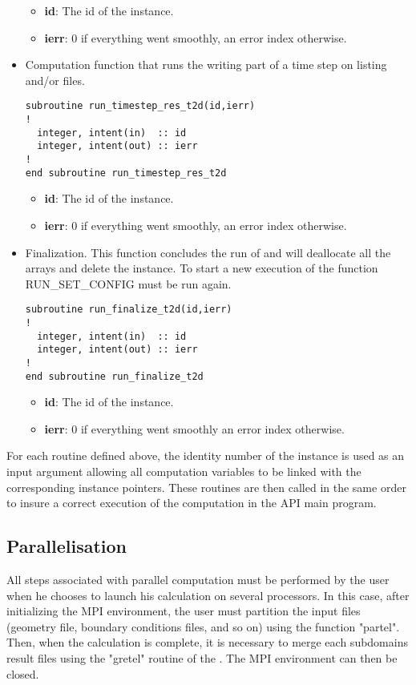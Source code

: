 \begin{itemize}
\begin{itemize}
\item \textbf{id}: The id of the instance.
\item \textbf{ierr}: 0 if everything went smoothly, an error index otherwise.
\end{itemize}

\item Computation function that runs the writing part of a time step on listing and/or files.

\begin{lstlisting}
subroutine run_timestep_res_t2d(id,ierr)
!
  integer, intent(in)  :: id
  integer, intent(out) :: ierr
!
end subroutine run_timestep_res_t2d
\end{lstlisting}


\begin{itemize}
\item \textbf{id}: The id of the instance.
\item \textbf{ierr}: 0 if everything went smoothly, an error index otherwise.
\end{itemize}

\item Finalization. This function concludes the run of  and will
  deallocate all the arrays and delete the instance. To start a new execution
  of  the function RUN\_SET\_CONFIG must be run again.


\begin{lstlisting}
subroutine run_finalize_t2d(id,ierr)
!
  integer, intent(in)  :: id
  integer, intent(out) :: ierr
!
end subroutine run_finalize_t2d
\end{lstlisting}

\begin{itemize}
\item \textbf{id}: The id of the instance.
\item \textbf{ierr}: 0 if everything went smoothly an error index otherwise.
\end{itemize}

\end{itemize}

For each routine defined above, the identity number of the instance is used as
an input argument allowing all computation variables to be linked with the
corresponding instance pointers. These routines are then called in the same
order to insure a correct execution of the computation in the API main
program.

\subsection{Parallelisation}
\label{subsec:para}
All steps associated with parallel computation must be performed by the user
when he chooses to launch his calculation on several processors. In this case,
after initializing the MPI environment, the user must partition the input files
(geometry file, boundary conditions files, and so on) using the \fortran
function "partel". Then, when the calculation is complete, it is necessary to
merge each subdomains result files using the "gretel" routine of the
\telemacsystem. The MPI environment can then be closed.

